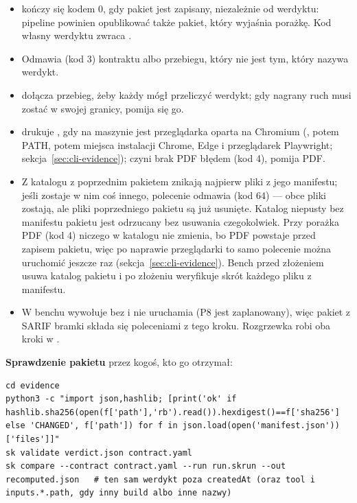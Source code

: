 \begin{itemize}
  \item {} kończy się kodem 0, gdy pakiet jest zapisany, niezależnie od
        werdyktu: pipeline powinien opublikować także pakiet, który wyjaśnia porażkę. Kod
        własny werdyktu zwraca .
  \item Odmawia (kod 3) kontraktu albo przebiegu, który nie jest tym, który nazywa werdykt.
  \item {} dołącza przebieg, żeby każdy mógł przeliczyć werdykt; gdy
        nagrany ruch musi zostać w swojej granicy, pomija się go.
  \item {} drukuje , gdy na maszynie jest
        przeglądarka oparta na Chromium (, potem PATH, potem
        miejsca instalacji Chrome, Edge i przeglądarek Playwright;
        sekcja~\ref{sec:cli-evidence});  czyni brak PDF błędem (kod 4),
         pomija PDF.
  \item Z katalogu z poprzednim pakietem znikają najpierw pliki z jego manifestu; jeśli
        zostaje w nim coś innego, polecenie odmawia (kod 64) --- obce pliki zostają, ale pliki
        poprzedniego pakietu są już usunięte. Katalog niepusty bez manifestu pakietu jest
        odrzucany bez usuwania czegokolwiek. Przy  porażka PDF
        (kod 4) niczego w katalogu nie zmienia, bo PDF powstaje przed zapisem pakietu, więc po
        naprawie przeglądarki to samo polecenie można uruchomić jeszcze raz
        (sekcja~\ref{sec:cli-evidence}). Bench przed złożeniem usuwa katalog pakietu i po
        złożeniu weryfikuje skrót każdego pliku z manifestu.
  \item W benchu  wywołuje  bez
         i nie uruchamia  (P8 jest zaplanowany), więc
        pakiet z SARIF bramki składa się poleceniami z tego kroku. Rozgrzewka robi oba
        kroki w .
\end{itemize}

\textbf{Sprawdzenie pakietu} przez kogoś, kto go otrzymał:

\begin{lstlisting}
cd evidence
python3 -c "import json,hashlib; [print('ok' if hashlib.sha256(open(f['path'],'rb').read()).hexdigest()==f['sha256'] else 'CHANGED', f['path']) for f in json.load(open('manifest.json'))['files']]"
sk validate verdict.json contract.yaml
sk compare --contract contract.yaml --run run.skrun --out recomputed.json   # ten sam werdykt poza createdAt (oraz tool i inputs.*.path, gdy inny build albo inne nazwy)
\end{lstlisting}

